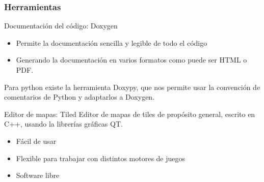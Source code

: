 \begin{frame}
    \frametitle{Herramientas}

        \begin{block}{Documentación del código: Doxygen}
            \begin{itemize}
                \item Permite la documentación sencilla y legible de todo el código
                \item Generando la documentación en varios formatos como puede ser HTML o PDF.
            \end{itemize}
        Para python existe la herramienta Doxypy, que nos permite usar la convención de comentarios de
        Python y adaptarlos a Doxygen.
        \end{block}

        \begin{block}{Editor de mapas: Tiled}
        Editor de mapas de tiles de propósito general, escrito en C++, usando la librerías gráficas QT.
            \begin{itemize}
                \item Fácil de usar
                \item Flexible para trabajar con distintos motores de juegos
                \item Software libre
            \end{itemize}
        \end{block}

\end{frame}


